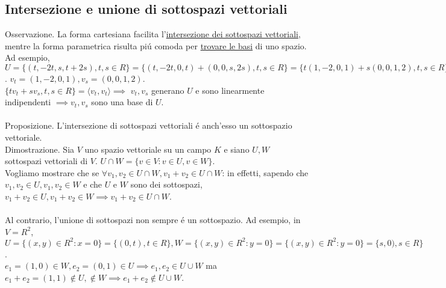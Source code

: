 \documentclass{article}
\begin{document}
\subsection{Intersezione e unione di sottospazi vettoriali}
Osservazione. La forma cartesiana facilita l'\underline{intersezione dei sottospazi vettoriali}, mentre la forma parametrica risulta piú comoda per \underline{trovare le basi} di uno spazio.\\
Ad esempio, $U = \{(t,-2t,s,t+2s),t,s \in R\} = \{(t,-2t,0,t) + (0,0,s,2s),t,s \in R\} = \{t(1,-2,0,1) + s(0,0,1,2),t,s \in R\}$. $v_t = (1,-2,0,1), v_s = (0,0,1,2)$.\\
$\{tv_t + sv_s,t,s \in R\} = \langle v_t, v_t \rangle \implies$ $v_t,v_s$ generano $U$ e sono linearmente indipendenti $\implies v_t, v_s$ sono una base di $U$.\\\\
Proposizione. L'intersezione di sottospazi vettoriali é anch'esso un sottospazio vettoriale.\\
Dimostrazione. Sia $V$ uno spazio vettoriale su un campo $K$ e siano $U,W$ sottospazi vettoriali di $V$. $U \cap W = \{v \in V : v \in U, v \in W\}$.\\
Vogliamo mostrare che se $\forall v_1, v_2 \in U \cap W, v_1 + v_2 \in U \cap W$: in effetti, sapendo che $v_1, v_2 \in U, v_1, v_2 \in W$ e che $U$ e $W$ sono dei sottospazi, $v_1 + v_2 \in U, v_1 + v_2 \in W \implies v_1 + v_2 \in U \cap W$.\\\\
Al contrario, l'unione di sottospazi non sempre é un sottospazio. Ad esempio, in $V = R^2$, $U = \{(x,y) \in R^2 : x = 0\} = \{(0,t), t \in R\}, W = \{(x,y) \in R^2 : y = 0\} = \{(x,y) \in R^2 : y = 0\} = \{s,0), s \in R\}$.\\
$e_1 = (1,0) \in W, e_2 = (0,1) \in U \implies e_1, e_2 \in U \cup W$ ma $e_1 + e_2 = (1,1) \notin U, \notin W \implies e_1 + e_2 \notin U \cup W$.
\end{document}
